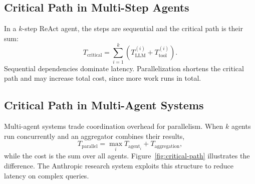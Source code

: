\documentclass[11pt]{book}
\begin{document}
\subsection{Critical Path in Multi-Step Agents}

In a $k$-step ReAct agent, the steps are sequential and the critical path is their sum:
\[
T_{\text{critical}} = \sum_{i=1}^{k} \left( T_{\text{LLM}}^{(i)} + T_{\text{tool}}^{(i)} \right).
\]
Sequential dependencies dominate latency. Parallelization shortens the critical path and may increase total cost, since more work runs in total.

\subsection{Critical Path in Multi-Agent Systems}

Multi-agent systems trade coordination overhead for parallelism. When $k$ agents run concurrently and an aggregator combines their results,
\[
T_{\text{parallel}} = \max_i T_{\text{agent}_i} + T_{\text{aggregation}},
\]
while the cost is the sum over all agents. Figure~\ref{fig:critical-path} illustrates the difference. The Anthropic research system \cite{anthropicresearch2025} exploits this structure to reduce latency on complex queries.
\end{document}
